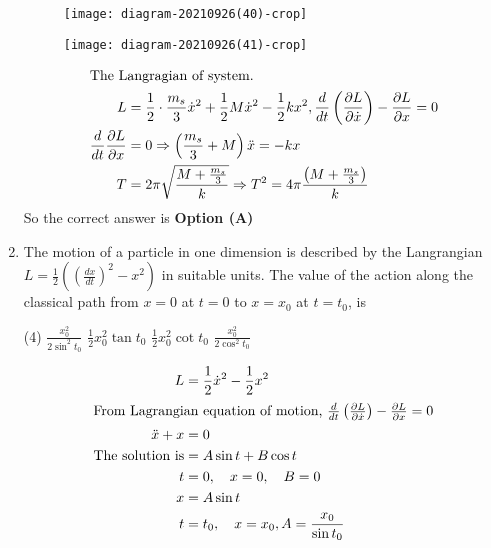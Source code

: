 \begin{enumerate}
\begin{tasks}
\task[\textbf{C.}] \begin{figure}[H]
	\centering
	\texttt{[image: diagram-20210926(40)-crop]}
\end{figure}
\task[\textbf{D.}] \begin{figure}[H]
	\centering
	\texttt{[image: diagram-20210926(41)-crop]}
\end{figure}
\end{tasks}
\begin{answer}
\begin{align*}
\intertext{The Langragian of system.}
L&=\frac{1}{2} \cdot \frac{m_{s}}{3} \dot{x}^{2}+\frac{1}{2} M \dot{x}^{2}-\frac{1}{2} k x^{2}, \frac{d}{d t}\left(\frac{\partial L}{\partial \dot{x}}\right)-\frac{\partial L}{\partial x}=0\\
\frac{d}{d t} \frac{\partial L}{\partial x}&=0 \Rightarrow\left(\frac{m_{s}}{3}+M\right) \ddot{x}=-k x\\
T&=2 \pi \sqrt{\frac{M+\frac{m_{s}}{3}}{k}} \Rightarrow T^{2}=4 \pi \frac{\left(M+\frac{m_{s}}{3}\right)}{k}
\end{align*}
So the correct answer is \textbf{Option (A)}
\end{answer}	
\item The motion of a particle in one dimension is described by the Langrangian $L=\frac{1}{2}\left(\left(\frac{d x}{d t}\right)^{2}-x^{2}\right)$ in suitable units. The value of the action along the classical path from $x=0$ at $t=0$ to $x=x_{0}$ at $t=t_{0}$, is
{}
\begin{tasks}(4)
\task[\textbf{A.}] $\frac{x_{0}^{2}}{2 \sin ^{2} t_{0}}$
\task[\textbf{B.}] $\frac{1}{2} x_{0}^{2} \tan t_{0}$
\task[\textbf{C.}] $\frac{1}{2} x_{0}^{2} \cot t_{0}$
\task[\textbf{D.}] $\frac{x_{0}^{2}}{2 \cos ^{2} t_{0}}$
\end{tasks}
\begin{answer}
\begin{align*}
L&=\frac{1}{2} \dot{x}^{2}-\frac{1}{2} x^{2}\\
\intertext{From Lagrangian equation of motion, $\frac{d}{d t}\left(\frac{\partial L}{\partial \dot{x}}\right)-\frac{\partial L}{\partial x}=0$}
\ddot{x}+x&=0\\
\text{The solution is}&=A \sin t+B \cos t\\
t&=0, \quad x=0, \quad B=0\\
x&=A \sin t\\
t&=t_{0}, \quad x=x_{0}, A=\frac{x_{0}}{\sin t_{0}}\\

\end{align*}
\end{answer}
\end{enumerate}
